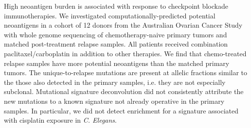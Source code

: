High neoantigen burden is associated with response to checkpoint blockade immunotherapies. We investigated computationally-predicted potential neoantigens in a cohort of 12 donors from the Australian Ovarian Cancer Study with whole genome sequencing of chemotherapy-naive primary tumors and matched post-treatment relapse samples. All patients received combination paclitaxel/carboplatin in addition to other therapies. We find that chemo-treated relapse samples have more potential neoantigens than the matched primary tumors. The unique-to-relapse mutations are present at allelic fractions similar to the those also detected in the primary samples, i.e. they are not especially subclonal. Mutational signature deconvolution did not consistently attribute the new mutations to a known signature not already operative in the primary samples. In particular, we did not detect enrichment for a signature associated with cisplatin exposure in \textit{C. Elegans}.


